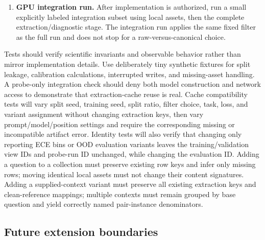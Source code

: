 \documentclass[11pt]{article}
\begin{document}
\begin{enumerate}
Verify scalar Brier against a hand-computable fixture, fixed-frequency awareness predictions against training-label counts, and contextual-answer predictions against cached canonical probabilities.
Verify that saved predictions suffice to recompute point metrics with model loading and probe fitting disabled; any later conditional-interval implementation must pass the same no-refitting check.
Acceptance: small hand-computable probability fixtures verify CE/Brier/$K$/ECE; clean deviation is zero; paired counts satisfy set-intersection bounds.
\item \textbf{GPU integration run.}
After implementation is authorized, run a small explicitly labeled integration subset using local assets, then the complete extraction/diagnostic stage.
The integration run applies the same fixed filter as the full run and does not stop for a raw-versus-canonical choice.
\end{enumerate}
Tests should verify scientific invariants and observable behavior rather than mirror implementation details.
Use deliberately tiny synthetic fixtures for split leakage, calibration calculations, interrupted writes, and missing-asset handling.
A probe-only integration check should deny both model construction and network access to demonstrate that extraction-cache reuse is real.
Cache compatibility tests will vary split seed, training seed, split ratio, filter choice, task, loss, and variant assignment without changing extraction keys, then vary prompt/model/position settings and require the corresponding missing or incompatible artifact error.
Identity tests will also verify that changing only reporting ECE bins or OOD evaluation variants leaves the training/validation view IDs and probe-run ID unchanged, while changing the evaluation ID.
Adding a question to a collection must preserve existing row keys and infer only missing rows; moving identical local assets must not change their content signatures.
Adding a supplied-context variant must preserve all existing extraction keys and clean-reference mappings; multiple contexts must remain grouped by base question and yield correctly named pair-instance denominators.

\subsection{Future extension boundaries}
\end{document}
